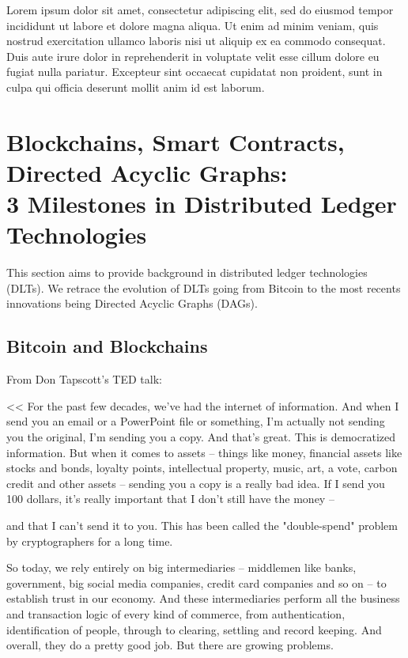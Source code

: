 \documentclass[a4paper]{article}
\begin{document}
Lorem ipsum dolor sit amet, consectetur adipiscing elit, sed do eiusmod tempor incididunt ut labore et dolore magna aliqua. Ut enim ad minim veniam, quis nostrud exercitation ullamco laboris nisi ut aliquip ex ea commodo consequat. Duis aute irure dolor in reprehenderit in voluptate velit esse cillum dolore eu fugiat nulla pariatur. Excepteur sint occaecat cupidatat non proident, sunt in culpa qui officia deserunt mollit anim id est laborum.

\newpage

\section{Blockchains, Smart Contracts, Directed Acyclic Graphs:\\ 3 Milestones in Distributed Ledger Technologies}

This section aims to provide background in distributed ledger technologies (DLTs). We retrace the evolution of DLTs going from Bitcoin to the most recents innovations being Directed Acyclic Graphs (DAGs). 

\subsection{Bitcoin and Blockchains}

From Don Tapscott's TED talk:

<<
For the past few decades, we've had the internet of information. And when I send you an email or a PowerPoint file or something, I'm actually not sending you the original, I'm sending you a copy. And that's great. This is democratized information. But when it comes to assets -- things like money, financial assets like stocks and bonds, loyalty points, intellectual property, music, art, a vote, carbon credit and other assets -- sending you a copy is a really bad idea. If I send you 100 dollars, it's really important that I don't still have the money --

and that I can't send it to you. This has been called the "double-spend" problem by cryptographers for a long time.

So today, we rely entirely on big intermediaries -- middlemen like banks, government, big social media companies, credit card companies and so on -- to establish trust in our economy. And these intermediaries perform all the business and transaction logic of every kind of commerce, from authentication, identification of people, through to clearing, settling and record keeping. And overall, they do a pretty good job. But there are growing problems.
\end{document}
